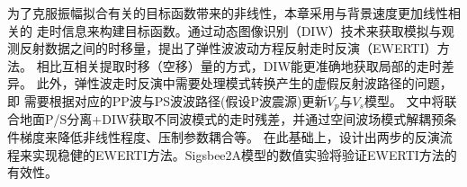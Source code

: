 为了克服振幅拟合有关的目标函数带来的非线性，本章采用与背景速度更加线性相关的
走时信息来构建目标函数。通过动态图像识别（DIW）技术来获取模拟与观测反射数据之间的时移量\cite{ma2013}，提出了弹性波波动方程反射走时反演（EWERTI）方法。
相比互相关提取时移（空移）量的方式\cite{chi2015,Wang2015}，DIW能更准确地获取局部的走时差异。
此外，弹性波走时反演中需要处理模式转换产生的虚假反射波路径的问题，即
需要根据对应的PP波与PS波波路径(假设P波震源)更新$V_p$与$V_s$模型。
文中将联合地面P/S分离+DIW获取不同波模式的走时残差，并通过空间波场模式解耦预条件梯度来降低非线性程度、压制参数耦合等。
在此基础上，设计出两步的反演流程来实现稳健的EWERTI方法。Sigsbee2A模型的数值实验将验证EWERTI方法的有效性。
